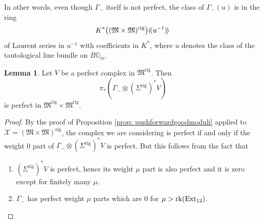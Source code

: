 \documentclass[12pt]{amsart}
\theoremstyle{definition}
\newtheorem{lemma}[definition]{Lemma}
\newcommand{\BG}{{\mathbb{G}}}
\newcommand{\CX}{{\mathcal X}}
\newcommand{\1}{\mathbf 1}
\newcommand{\FM}{{\mathfrak{M}}}
\newcommand{\Ext}{\mathcal{E}\text{xt}}
\newcommand{\lpp}{(\hspace{-0.15em}(}
\newcommand{\rpp}{)\hspace{-0.15em})}
\newcommand{\rk}{\mathrm{rk}}
\newcommand{\rig}{\mathrm{rig}}
\renewcommand{\Ext}{\textup{Ext}}
\begin{document}
In other words, even though $\Gamma_-$ itself is not perfect, the class of $\Gamma_-(u)$ is in the ring
\[K^\ast\big((\FM\times \FM)^\rig\big)\lpp u^{-1}\rpp\,\]
of Laurent series in $u^{-1}$ with coefficients in $K^\ast$, where $u$ denotes the class of the tautological line bundle on $B\BG_m$.


\begin{lemma}\label{lem: astwelldefined}
    Let $V$ be a perfect complex in $\FM^\rig$. Then 
    \[\pi_\ast(\Gamma_-\otimes (\Sigma^\rig)^\ast V)\]
    is perfect in $\FM^\rig\times \FM^\rig$. 
\end{lemma}
\begin{proof}
By the proof of Proposition \ref{prop: pushforwardgoodmoduli} applied to $\CX=(\FM\times \FM)^\rig$, the complex we are considering is perfect if and only if the weight 0 part of $\Gamma_-\otimes (\Sigma^\rig)^\ast V$ is perfect. But this follows from the fact that 
\begin{enumerate}
    \item $(\Sigma^\rig)^\ast V$ is perfect, hence its weight $\mu$ part is also perfect and it is zero except for finitely many $\mu$.
    \item $\Gamma_-$ has perfect weight $\mu$ parts which are 0 for $\mu>\rk(\Ext_{12})$.\qedhere
\end{enumerate}
\end{proof}
\end{document}
